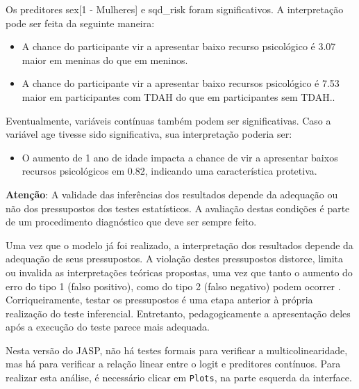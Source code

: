 \documentclass[
]{book}
\providecommand{\tightlist}{%
  \setlength{\itemsep}{0pt}\setlength{\parskip}{0pt}}
\newenvironment{warning}{
  \definecolor{shadecolor}{rgb}{0, 0, 0}  %
  \color{white}
  \begin{shaded}}
 {\end{shaded}}
\begin{document}
Os preditores sex{[}1 - Mulheres{]} e sqd\_risk foram significativos. A interpretação pode ser feita da seguinte maneira:

\begin{itemize}
\tightlist
\item
  A chance do participante vir a apresentar baixo recurso psicológico é 3.07 maior em meninas do que em meninos.
\item
  A chance do participante vir a apresentar baixo recursos psicológico é 7.53 maior em participantes com TDAH do que em participantes sem TDAH..
\end{itemize}

Eventualmente, variáveis contínuas também podem ser significativas. Caso a variável age tivesse sido significativa, sua interpretação poderia ser:

\begin{itemize}
\tightlist
\item
  O aumento de 1 ano de idade impacta a chance de vir a apresentar baixos recursos psicológicos em 0.82, indicando uma característica protetiva.
\end{itemize}

\begin{warning}

\textbf{Atenção}: A validade das inferências dos resultados depende da adequação ou não dos pressupostos dos testes estatísticos. A avaliação destas condições é parte de um procedimento diagnóstico que deve ser sempre feito.

\end{warning}

Uma vez que o modelo já foi realizado, a interpretação dos resultados depende da adequação de seus pressupostos. A violação destes pressupostos distorce, limita ou invalida as interpretações teóricas propostas, uma vez que tanto o aumento do erro do tipo 1 (falso positivo), como do tipo 2 (falso negativo) podem ocorrer \citep{Lix1996, Barker2015, Ernst2017}. Corriqueiramente, testar os pressupostos é uma etapa anterior à própria realização do teste inferencial. Entretanto, pedagogicamente a apresentação deles após a execução do teste parece mais adequada.

Nesta versão do JASP, não há testes formais para verificar a multicolinearidade, mas há para verificar a relação linear entre o logit e preditores contínuos. Para realizar esta análise, é necessário clicar em \texttt{Plots}, na parte esquerda da interface.
\end{document}
